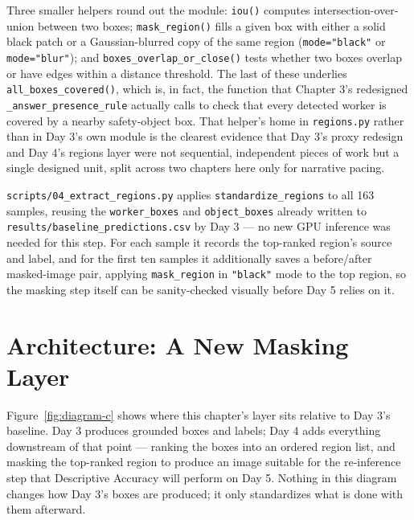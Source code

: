 Three smaller helpers round out the module: \texttt{iou()} computes intersection-over-union between
two boxes; \texttt{mask\_region()} fills a given box with either a solid black patch or a
Gaussian-blurred copy of the same region (\texttt{mode="black"} or \texttt{mode="blur"}); and
\texttt{boxes\_overlap\_or\_close()} tests whether two boxes overlap or have edges within a distance
threshold. The last of these underlies \texttt{all\_boxes\_covered()}, which is, in fact, the
function that Chapter 3's redesigned \texttt{\_answer\_presence\_rule} actually calls to check that
every detected worker is covered by a nearby safety-object box. That helper's home in
\texttt{regions.py} rather than in Day 3's own module is the clearest evidence that Day 3's proxy
redesign and Day 4's regions layer were not sequential, independent pieces of work but a single
designed unit, split across two chapters here only for narrative pacing.

\texttt{scripts/04\_extract\_regions.py} applies \texttt{standardize\_regions} to all 163 samples,
reusing the \texttt{worker\_boxes} and \texttt{object\_boxes} already written to
\texttt{results/baseline\_predictions.csv} by Day 3 --- no new GPU inference was needed for this
step. For each sample it records the top-ranked region's source and label, and for the first ten
samples it additionally saves a before/after masked-image pair, applying \texttt{mask\_region} in
\texttt{"black"} mode to the top region, so the masking step itself can be sanity-checked visually
before Day 5 relies on it.

\section{Architecture: A New Masking Layer}

Figure~\ref{fig:diagram-c} shows where this chapter's layer sits relative to Day 3's baseline.
Day 3 produces grounded boxes and labels; Day 4 adds everything downstream of that point ---
ranking the boxes into an ordered region list, and masking the top-ranked region to produce an
image suitable for the re-inference step that Descriptive Accuracy will perform on Day 5. Nothing
in this diagram changes how Day 3's boxes are produced; it only standardizes what is done with them
afterward.

